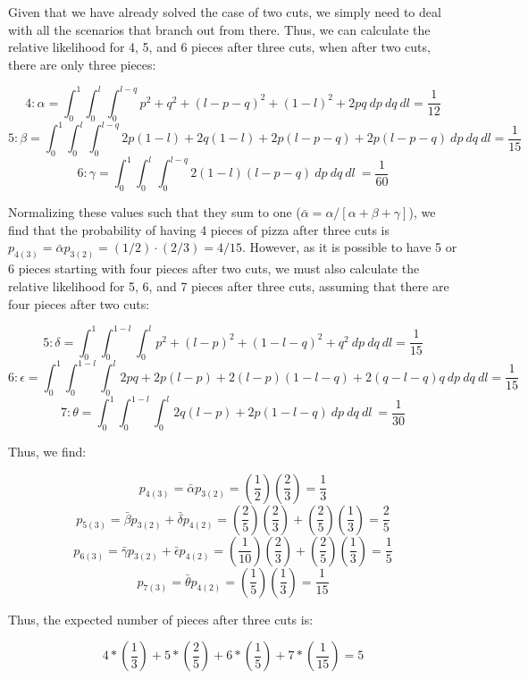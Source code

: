 \documentclass{article}
\begin{document}
\pagebreak

Given that we have already solved the case of two cuts, we simply need to deal with all the scenarios that branch out from there. Thus, we can calculate the relative likelihood for 4, 5, and 6 pieces after three cuts, when after two cuts, there are only three pieces:

$$4: \alpha = \int_0^1 \int_0^l \int_0^{l - q} p^2 + q^2 + (l - p - q)^2 + (1 - l)^2 + 2pq~dp~dq~dl = \frac{1}{12}$$
$$5: \beta  = \int_0^1 \int_0^l \int_0^{l - q} 2p(1 -l) + 2q(1 - l) + 2p(l - p - q) + 2p(l -p - q)~dp~dq~dl = \frac{1}{15}$$
$$6: \gamma = \int_0^1 \int_0^l \int_0^{l - q} 2(1 - l)(l - p - q)~dp~dq~dl~ = \frac{1}{60}$$

Normalizing these values such that they sum to one ($\bar{\alpha} = \alpha/[\alpha + \beta + \gamma]$), we find that the probability of having 4 pieces of pizza after three cuts is $p_{4(3)} = \bar{\alpha}p_{3(2)} = (1/2)\cdot(2/3) = 4/15$. However, as it is possible to have 5 or 6 pieces starting with four pieces after two cuts, we must also calculate the relative likelihood for 5, 6, and 7 pieces after three cuts, assuming that there are four pieces after two cuts:

$$5: \delta = \int_0^1 \int_0^{1 - l} \int_0^l p^2 + (l - p)^2 + (1 - l - q)^2 + q^2~dp~dq~dl = \frac{1}{15}$$
$$6: \epsilon = \int_0^1 \int_0^{1 - l} \int_0^l 2pq + 2p(l - p) + 2 (l - p)(1 - l - q) + 2(q - l - q)q~dp~dq~dl = \frac{1}{15}$$
$$7: \theta = \int_0^1 \int_0^{1 - l} \int_0^l 2q(l - p) + 2p(1 - l - q)~dp~dq~dl~ = \frac{1}{30}$$

Thus, we find:

$$p_{4(3)} = \bar{\alpha}p_{3(2)} = \left(\frac{1}{2}\right)\left(\frac{2}{3}\right) = \frac{1}{3}$$
$$p_{5(3)} = \bar{\beta}p_{3(2)} + \bar{\delta}p_{4(2)} = \left(\frac{2}{5}\right)\left(\frac{2}{3}\right) + \left(\frac{2}{5}\right)\left(\frac{1}{3}\right) = \frac{2}{5}$$
$$p_{6(3)} = \bar{\gamma}p_{3(2)} + \bar{\epsilon}p_{4(2)} = \left(\frac{1}{10}\right)\left(\frac{2}{3}\right) + \left(\frac{2}{5}\right)\left(\frac{1}{3}\right)= \frac{1}{5}$$
$$p_{7(3)} = \bar{\theta}p_{4(2)} = \left(\frac{1}{5}\right)\left(\frac{1}{3}\right) = \frac{1}{15}$$

Thus, the expected number of pieces after three cuts is:

$$ 4*\left(\frac{1}{3}\right) + 5*\left(\frac{2}{5}\right) + 6*\left(\frac{1}{5}\right) + 7*\left(\frac{1}{15}\right) = 5$$
\end{document}
